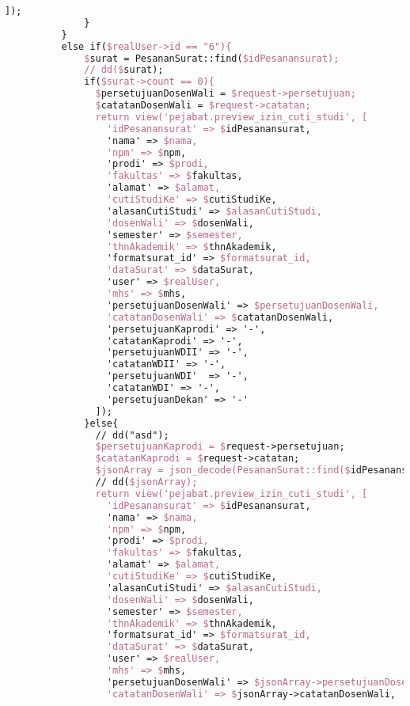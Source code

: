 \begin{lstlisting}[language=tex,basicstyle=\tiny,caption=PesanansuratController.php]
                ]);
              }
          }
          else if($realUser->id == "6"){
              $surat = PesananSurat::find($idPesanansurat);
              // dd($surat);
              if($surat->count == 0){
                $persetujuanDosenWali = $request->persetujuan;
                $catatanDosenWali = $request->catatan;
                return view('pejabat.preview_izin_cuti_studi', [
                  'idPesanansurat' => $idPesanansurat,
                  'nama' => $nama,
                  'npm' => $npm,
                  'prodi' => $prodi,
                  'fakultas' => $fakultas,
                  'alamat' => $alamat,
                  'cutiStudiKe' => $cutiStudiKe,
                  'alasanCutiStudi' => $alasanCutiStudi,
                  'dosenWali' => $dosenWali,
                  'semester' => $semester,
                  'thnAkademik' => $thnAkademik,
                  'formatsurat_id' => $formatsurat_id,
                  'dataSurat' => $dataSurat,
                  'user' => $realUser,
                  'mhs' => $mhs,
                  'persetujuanDosenWali' => $persetujuanDosenWali,
                  'catatanDosenWali' => $catatanDosenWali,
                  'persetujuanKaprodi' => '-',
                  'catatanKaprodi' => '-',
                  'persetujuanWDII' => '-',
                  'catatanWDII' => '-',
                  'persetujuanWDI'  => '-',
                  'catatanWDI' => '-',
                  'persetujuanDekan' => '-'
                ]);
              }else{
                // dd("asd");
                $persetujuanKaprodi = $request->persetujuan;
                $catatanKaprodi = $request->catatan;
                $jsonArray = json_decode(PesananSurat::find($idPesanansurat)->dataSurat);
                // dd($jsonArray);
                return view('pejabat.preview_izin_cuti_studi', [
                  'idPesanansurat' => $idPesanansurat,
                  'nama' => $nama,
                  'npm' => $npm,
                  'prodi' => $prodi,
                  'fakultas' => $fakultas,
                  'alamat' => $alamat,
                  'cutiStudiKe' => $cutiStudiKe,
                  'alasanCutiStudi' => $alasanCutiStudi,
                  'dosenWali' => $dosenWali,
                  'semester' => $semester,
                  'thnAkademik' => $thnAkademik,
                  'formatsurat_id' => $formatsurat_id,
                  'dataSurat' => $dataSurat,
                  'user' => $realUser,
                  'mhs' => $mhs,
                  'persetujuanDosenWali' => $jsonArray->persetujuanDosenWali,
                  'catatanDosenWali' => $jsonArray->catatanDosenWali,

\end{lstlisting}
